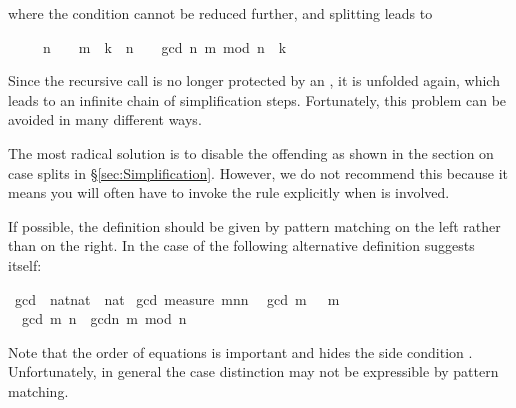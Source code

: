 \begin{isabellebody}
\begin{isamarkuptext}
\begin{isabelle}
\end{isabelle}
where the condition cannot be reduced further, and splitting leads to
\begin{isabelle}%
\ \ \ \ \ {\isacharparenleft}n\ {\isacharequal}\ \ {\isasymlongrightarrow}\ m\ {\isacharequal}\ k{\isacharparenright}\ {\isasymand}\ {\isacharparenleft}n\ {\isasymnoteq}\ \ {\isasymlongrightarrow}\ gcd\ {\isacharparenleft}n{\isacharcomma}\ m\ mod\ n{\isacharparenright}\ {\isacharequal}\ k{\isacharparenright}%
\end{isabelle}
Since the recursive call  is no longer protected by
an , it is unfolded again, which leads to an infinite chain of
simplification steps. Fortunately, this problem can be avoided in many
different ways.

The most radical solution is to disable the offending
 as shown in the section on case splits in
\S\ref{sec:Simplification}.  However, we do not recommend this because it
means you will often have to invoke the rule explicitly when  is
involved.

If possible, the definition should be given by pattern matching on the left
rather than  on the right. In the case of  the
following alternative definition suggests itself:%
\end{isamarkuptext}%
\ gcd\ {\isacharcolon}{\isacharcolon}\ {\isachardoublequote}nat{\isasymtimes}nat\ {\isasymRightarrow}\ nat{\isachardoublequote}\isanewline
{}\ gcd\ {\isachardoublequote}measure\ {\isacharparenleft}{\isasymlambda}{\isacharparenleft}m{\isacharcomma}n{\isacharparenright}{\isachardot}n{\isacharparenright}{\isachardoublequote}\isanewline
\ \ {\isachardoublequote}gcd\ {\isacharparenleft}m{\isacharcomma}\ \ {\isacharequal}\ m{\isachardoublequote}\isanewline
\ \ {\isachardoublequote}gcd\ {\isacharparenleft}m{\isacharcomma}\ n{\isacharparenright}\ {\isacharequal}\ gcdn{\isacharcomma}\ m\ mod\ n{\isacharparenright}{\isachardoublequote}%
\begin{isamarkuptext}%
\noindent
Note that the order of equations is important and hides the side condition
. Unfortunately, in general the case distinction
may not be expressible by pattern matching.


\end{isamarkuptext}
\end{isabellebody}
